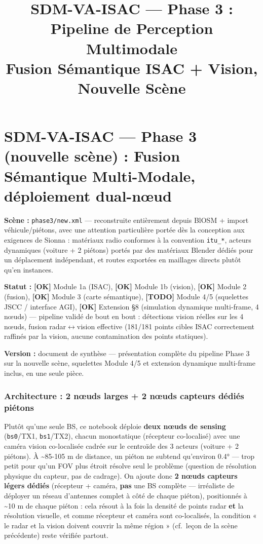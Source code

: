 \documentclass[11pt]{article}
\title{SDM-VA-ISAC --- Phase 3 : Pipeline de Perception Multimodale\\ \large Fusion Sémantique ISAC + Vision, Nouvelle Scène}
\begin{document}
    
    \maketitle
    
    

    
    \section{SDM-VA-ISAC --- Phase 3 (nouvelle scène) : Fusion Sémantique
Multi-Modale, déploiement
dual-nœud}\label{sdm-va-isac-phase-3-nouvelle-scuxe8ne-fusion-suxe9mantique-multi-modale-duxe9ploiement-dual-nux153ud}

\textbf{Scène :} \texttt{phase3/new.xml} --- reconstruite entièrement
depuis BlOSM + import véhicule/piétons, avec une attention particulière
portée dès la conception aux exigences de Sionna : matériaux radio
conformes à la convention \texttt{itu\_*}, acteurs dynamiques (voiture +
2 piétons) portés par des matériaux Blender dédiés pour un déplacement
indépendant, et routes exportées en maillages directs plutôt qu'en
instances.

\textbf{Statut :} \textbf{[OK]} Module 1a (ISAC), \textbf{[OK]} Module 1b (vision), \textbf{[OK]} Module
2 (fusion), \textbf{[OK]} Module 3 (carte sémantique), \textbf{[TODO]} Module 4/5 (squelettes
JSCC / interface AGI), \textbf{[OK]} Extension §8 (simulation dynamique
multi-frame, 4 nœuds) --- pipeline validé de bout en bout : détections
vision réelles sur les 4 nœuds, fusion radar$\leftrightarrow$vision effective (181/181
points cibles ISAC correctement raffinés par la vision, aucune
contamination des points statiques).

\textbf{Version :} document de synthèse --- présentation complète du
pipeline Phase 3 sur la nouvelle scène, squelettes Module 4/5 et
extension dynamique multi-frame inclus, en une seule pièce.

\subsubsection{Architecture : 2 nœuds larges + 2 nœuds capteurs dédiés
piétons}\label{architecture-2-nux153uds-larges-2-nux153uds-capteurs-duxe9diuxe9s-piuxe9tons}

Plutôt qu'une seule BS, ce notebook déploie \textbf{deux nœuds de
sensing} (\texttt{bs0}/TX1, \texttt{bs1}/TX2), chacun monostatique
(récepteur co-localisé) avec une caméra vision co-localisée cadrée sur
le centroïde des 3 acteurs (voiture + 2 piétons). À
\textasciitilde85-105 m de distance, un piéton ne subtend qu'environ
0.4° --- trop petit pour qu'un FOV plus étroit résolve seul le problème
(question de résolution physique du capteur, pas de cadrage). On ajoute
donc \textbf{2 nœuds capteurs légers dédiés} (récepteur + caméra,
\textbf{pas} une BS complète --- irréaliste de déployer un réseau
d'antennes complet à côté de chaque piéton), positionnés à
\textasciitilde10 m de chaque piéton : cela résout à la fois la densité
de points radar \textbf{et} la résolution visuelle, et comme récepteur
et caméra sont co-localisés, la condition « le radar et la vision
doivent couvrir la même région » (cf.~leçon de la scène précédente)
reste vérifiée partout.
\end{document}
